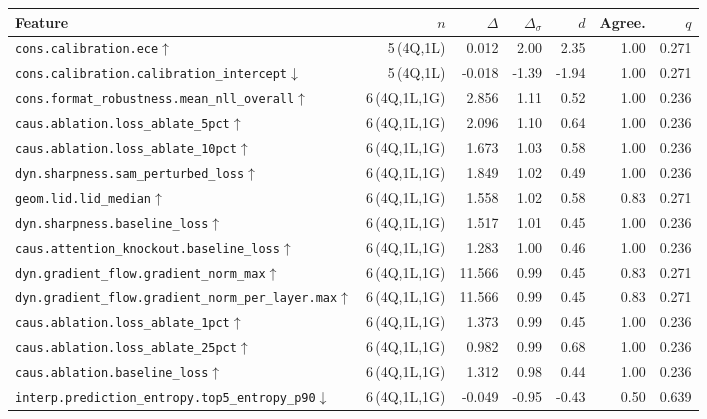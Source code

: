 \begin{tabular}{@{}lrrrrrr@{}}
\toprule
\textbf{Feature} & $n$ & $\Delta$ & $\Delta_{\sigma}$ & $d$ & \textbf{Agree.} & $q$ \\
\midrule
\texttt{cons.calibration.ece}$\uparrow$ & 5\,\scriptsize{(4Q,1L)} & 0.012 & 2.00 & 2.35 & 1.00 & 0.271 \\
\texttt{cons.calibration.calibration\_intercept}$\downarrow$ & 5\,\scriptsize{(4Q,1L)} & -0.018 & -1.39 & -1.94 & 1.00 & 0.271 \\
\texttt{cons.format\_robustness.mean\_nll\_overall}$\uparrow$ & 6\,\scriptsize{(4Q,1L,1G)} & 2.856 & 1.11 & 0.52 & 1.00 & 0.236 \\
\texttt{caus.ablation.loss\_ablate\_5pct}$\uparrow$ & 6\,\scriptsize{(4Q,1L,1G)} & 2.096 & 1.10 & 0.64 & 1.00 & 0.236 \\
\texttt{caus.ablation.loss\_ablate\_10pct}$\uparrow$ & 6\,\scriptsize{(4Q,1L,1G)} & 1.673 & 1.03 & 0.58 & 1.00 & 0.236 \\
\texttt{dyn.sharpness.sam\_perturbed\_loss}$\uparrow$ & 6\,\scriptsize{(4Q,1L,1G)} & 1.849 & 1.02 & 0.49 & 1.00 & 0.236 \\
\texttt{geom.lid.lid\_median}$\uparrow$ & 6\,\scriptsize{(4Q,1L,1G)} & 1.558 & 1.02 & 0.58 & 0.83 & 0.271 \\
\texttt{dyn.sharpness.baseline\_loss}$\uparrow$ & 6\,\scriptsize{(4Q,1L,1G)} & 1.517 & 1.01 & 0.45 & 1.00 & 0.236 \\
\texttt{caus.attention\_knockout.baseline\_loss}$\uparrow$ & 6\,\scriptsize{(4Q,1L,1G)} & 1.283 & 1.00 & 0.46 & 1.00 & 0.236 \\
\texttt{dyn.gradient\_flow.gradient\_norm\_max}$\uparrow$ & 6\,\scriptsize{(4Q,1L,1G)} & 11.566 & 0.99 & 0.45 & 0.83 & 0.271 \\
\texttt{dyn.gradient\_flow.gradient\_norm\_per\_layer.max}$\uparrow$ & 6\,\scriptsize{(4Q,1L,1G)} & 11.566 & 0.99 & 0.45 & 0.83 & 0.271 \\
\texttt{caus.ablation.loss\_ablate\_1pct}$\uparrow$ & 6\,\scriptsize{(4Q,1L,1G)} & 1.373 & 0.99 & 0.45 & 1.00 & 0.236 \\
\texttt{caus.ablation.loss\_ablate\_25pct}$\uparrow$ & 6\,\scriptsize{(4Q,1L,1G)} & 0.982 & 0.99 & 0.68 & 1.00 & 0.236 \\
\texttt{caus.ablation.baseline\_loss}$\uparrow$ & 6\,\scriptsize{(4Q,1L,1G)} & 1.312 & 0.98 & 0.44 & 1.00 & 0.236 \\
\texttt{interp.prediction\_entropy.top5\_entropy\_p90}$\downarrow$ & 6\,\scriptsize{(4Q,1L,1G)} & -0.049 & -0.95 & -0.43 & 0.50 & 0.639 \\

\end{tabular}
